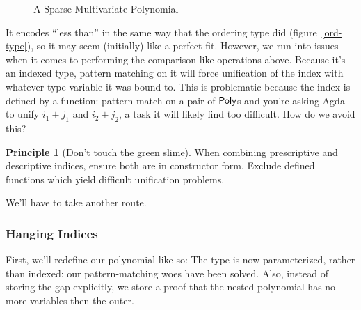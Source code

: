 \documentclass[draft, twocolumn]{article}
\theoremstyle{definition}
\theoremstyle{definition}
\newtheorem{principle}{Principle}[section]
\begin{document}
\begin{figure}
  \caption{A Sparse Multivariate Polynomial}
  \label{sparse-poly}
\end{figure}

It encodes ``less than'' in the same way that the ordering type did
(figure~\ref{ord-type}), so it may seem (initially) like a perfect fit. However,
we run into issues when it comes to performing the comparison-like operations
above. Because it's an indexed type, pattern matching on it will force
unification of the index with whatever type variable it was bound to. This is
problematic because the index is defined by a function: pattern match on a pair
of \(\AgdaDatatype{Poly}\)s and you're asking Agda to unify \(i_1 + j_1\) and
\(i_2 + j_2\), a task it will likely find too difficult. How do we avoid this?
\begin{principle}[Don't touch the green slime]
  When combining prescriptive and descriptive indices, ensure both are in
  constructor form. Exclude defined functions which yield difficult unification
  problems\cite{mcbride_polynomial_2018}.
\end{principle}
We'll have to take another route.
\subsubsection{Hanging Indices}
First, we'll redefine our polynomial like so:
The type is now parameterized, rather than indexed: our pattern-matching woes
have been solved. Also, instead of storing the gap explicitly, we store a proof
that the nested polynomial has no more variables then the outer.
\end{document}
